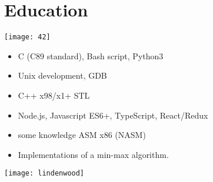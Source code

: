 \section{Education}

\begin{minipage}{.15\textwidth}
    \centerline{\texttt{[image: 42]}}
\end{minipage}%
\hspace{5mm}
\begin{minipage}{.9\textwidth}
    \raggedright
    \begin{minipage}[t]{.30\textwidth}
        \begin{itemize}
            \item C (C89 standard), Bash script, Python3
            \item Unix development, GDB
            \item C++ x98/x1+ STL
            \item Node.js, Javascript ES6+, TypeScript, React/Redux
            \item some knowledge ASM x86 (NASM)
        \end{itemize}
    \end{minipage}
    \begin{minipage}[t]{.30\textwidth}
        \begin{itemize}
            \item Implementations of a min-max algorithm.
        \end{itemize}
    \end{minipage}
\end{minipage}
\begin{minipage}{.15\textwidth}
    \centerline{\texttt{[image: lindenwood]}}
\end{minipage}%
\hspace{5mm}
